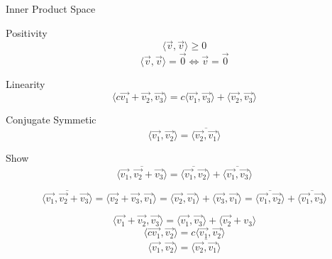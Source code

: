 \documentclass[10pt]{article}
\begin{document}
Inner Product Space

Positivity
$$\langle\vec{v}, \vec{v}\rangle \geq 0$$
$$\langle \vec{v} , \vec{v} \rangle = \vec{0} \iff \vec{v} = \vec{0}$$

Linearity 
$$\langle c\vec{v_1} + \vec{v_2}, \vec{v_3}\rangle = c\langle \vec{v_1}, \vec{v_3}\rangle + \langle\vec{v_2}, \vec{v_3} \rangle $$

Conjugate Symmetic 
$$\langle \vec{v_1}, \vec{v_2} \rangle = \overline{\langle \vec{v_2}, \vec{v_1} \rangle}$$


Show
$$\overline{\langle \vec{v_1} , \vec{v_2} + \vec{v_3} \rangle} = \overline{ \langle \vec{v_1} , \vec{v_2}} \rangle + \overline{ \langle \vec{v_1} , \vec{v_3} \rangle }$$

$$ \overline{\langle \vec{v_1} , \vec{v_2} + \vec{v_3} \rangle} = \langle \vec{v_2} + \vec{v_3} , \vec{v_1} \rangle = \langle \vec{v_2}, \vec{v_1} \rangle + \langle \vec{v_3}, \vec{v_1} \rangle = \overline{\langle \vec{v_1}, \vec{v_2} \rangle} + \overline{\langle \vec{v_1}, \vec{v_3} \rangle} $$


$$\langle\vec{v_1} + \vec{v_2}, \vec{v_3}\rangle = \langle\vec{v_1}, \vec{v_3}\rangle + \langle\vec{v_2} + {v_3}\rangle $$
$$\langle\vec{cv_1}, \vec{v_2}\rangle = c\langle\vec{v_1}, \vec{v_2}\rangle$$
$$\langle\vec{v_1}, \vec{v_2}\rangle = \overline{{\langle\vec{v_2}, \vec{v_1}\rangle}}$$
\end{document}
